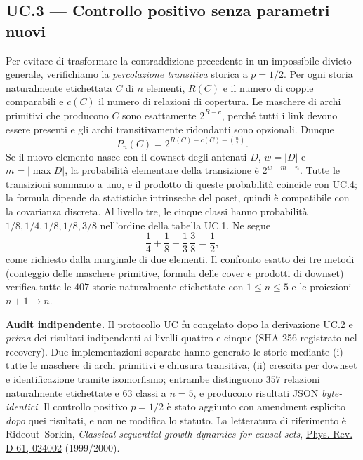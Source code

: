 \documentclass[11pt,a4paper]{article}
\begin{document}
\clearpage
\subsection*{UC.3 --- Controllo positivo senza parametri nuovi}
Per evitare di trasformare la contraddizione precedente in un impossibile divieto generale, verifichiamo la \emph{percolazione transitiva} storica a $p=1/2$. Per ogni storia naturalmente etichettata $C$ di $n$ elementi, $R(C)$ e il numero di coppie comparabili e $c(C)$ il numero di relazioni di copertura. Le maschere di archi primitivi che producono $C$ sono esattamente $2^{R-c}$, perch\'e tutti i link devono essere presenti e gli archi transitivamente ridondanti sono opzionali. Dunque
\begin{equation}
\boxed{P_n(C)=2^{R(C)-c(C)-\binom n2}.}\tag{UC.4}
\end{equation}
Se il nuovo elemento nasce con il downset degli antenati $D$, $w=|D|$ e $m=|\max D|$, la probabilit\`a elementare della transizione \`e $2^{w-m-n}$. Tutte le transizioni sommano a uno, e il prodotto di queste probabilit\`a coincide con UC.4; la formula dipende da statistiche intrinseche del poset, quindi \`e compatibile con la covarianza discreta. Al livello tre, le cinque classi hanno probabilit\`a $1/8,1/4,1/8,1/8,3/8$ nell'ordine della tabella UC.1. Ne segue
\begin{equation}
\frac14+\frac18+\frac13\,\frac38=\frac12,
\tag{UC.5}
\end{equation}
come richiesto dalla marginale di due elementi. Il confronto esatto dei tre metodi (conteggio delle maschere primitive, formula delle cover e prodotti di downset) verifica tutte le $407$ storie naturalmente etichettate con $1\le n\le5$ e le proiezioni $n+1\to n$.

\textbf{Audit indipendente.} Il protocollo UC fu congelato dopo la derivazione UC.2 e \emph{prima} dei risultati indipendenti ai livelli quattro e cinque (SHA-256 registrato nel recovery). Due implementazioni separate hanno generato le storie mediante (i) tutte le maschere di archi primitivi e chiusura transitiva, (ii) crescita per downset e identificazione tramite isomorfismo; entrambe distinguono $357$ relazioni naturalmente etichettate e $63$ classi a $n=5$, e producono risultati JSON \emph{byte-identici}. Il controllo positivo $p=1/2$ \`e stato aggiunto con amendment esplicito \emph{dopo} quei risultati, e non ne modifica lo statuto. La letteratura di riferimento \`e Rideout--Sorkin, \emph{Classical sequential growth dynamics for causal sets}, \href{https://doi.org/10.1103/PhysRevD.61.024002}{Phys. Rev. D 61, 024002} (1999/2000).
\end{document}

